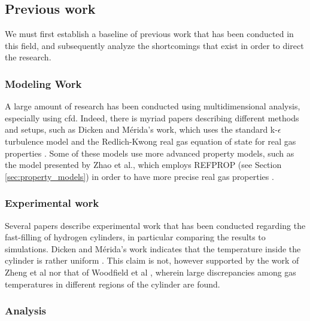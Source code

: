\subsection{Previous work}

We must first establish a baseline of previous work that has been conducted in this field, and subsequently analyze the shortcomings that exist in order to direct the research.

\subsubsection{Modeling Work}
A large amount of research has been conducted using multidimensional analysis, especially using \gls{cfd}. Indeed, there is myriad papers describing different methods and setups, such as Dicken and M\'erida's work, which uses the standard  k-$\epsilon$ turbulence model  and the Redlich-Kwong real gas equation of state for real gas properties \cite{Dicken2007a}. 
Some of these models use more advanced property models, such as the model presented by Zhao et al., which employs REFPROP (see Section \ref{sec:property_models}) in order to have more precise real gas properties \cite{Zhao2012}.

\subsubsection{Experimental work}
\label{sec:experimental_work}
Several papers describe experimental work that has been conducted regarding the fast-filling of hydrogen cylinders, in particular comparing the results to simulations. Dicken and M\'erida's work indicates that the temperature inside the cylinder is rather uniform \cite{Dicken2007}. This claim is not, however supported by the work of Zheng et al  nor that of Woodfield et al \cite{Woodfield2008}, wherein large discrepancies among gas temperatures in different regions of the cylinder are found.

\subsubsection{Analysis}


